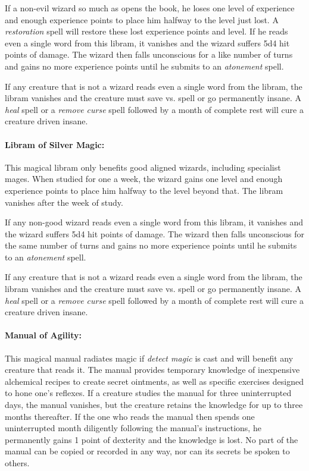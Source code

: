 \begin{multicols}{2}
If a non-evil wizard so much as opens the book, he loses one level of experience and enough experience points to place him halfway to the level just lost.  A \textit{restoration} spell will restore these lost experience points and level.  If he reads even a single word from this libram, it vanishes and the wizard suffers 5d4 hit points of damage.  The wizard then falls unconscious for a like number of turns and gains no more experience points until he submits to an \textit{atonement} spell.  

If any creature that is not a wizard reads even a single word from the libram, the libram vanishes and the creature must save vs. spell or go permanently insane.  A \textit{heal} spell or a \textit{remove curse} spell followed by a month of complete rest will cure a creature driven insane.

\paragraph{Libram of Silver Magic:} This magical libram only benefits good aligned wizards, including specialist mages.  When studied for one a week, the wizard gains one level and enough experience points to place him halfway to the level beyond that.  The libram vanishes after the week of study.

If any non-good wizard reads even a single word from this libram, it vanishes and the wizard suffers 5d4 hit points of damage.  The wizard then falls unconscious for the same number of turns and gains no more experience points until he submits to an \textit{atonement} spell.  

If any creature that is not a wizard reads even a single word from the libram, the libram vanishes and the creature must save vs. spell or go permanently insane.  A \textit{heal} spell or a \textit{remove curse} spell followed by a month of complete rest will cure a creature driven insane.

\paragraph{Manual of Agility:} This magical manual radiates magic if \textit{detect magic} is cast and will benefit any creature that reads it.  The manual provides temporary knowledge of inexpensive alchemical recipes to create secret ointments, as well as specific exercises designed to hone one's reflexes.  If a creature studies the manual for three uninterrupted days, the manual vanishes, but the creature retains the knowledge for up to three months thereafter.  If the one who reads the manual then spends one uninterrupted month diligently following the manual's instructions, he permanently gains 1 point of dexterity and the knowledge is lost.  No part of the manual can be copied or recorded in any way, nor can its secrets be spoken to others.  


\end{multicols}
